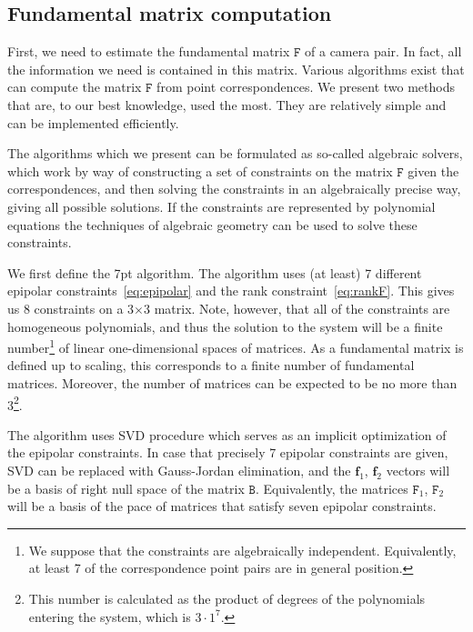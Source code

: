 \subsection{Fundamental matrix computation}

First, we need to estimate the fundamental matrix $\mathtt{F}$ of a camera pair. In fact, all the information we need is contained in this matrix. 
Various algorithms exist that can compute the matrix $\mathtt{F}$ from point correspondences. We present two methods that are, to our best knowledge, used the most. They are relatively simple and can be implemented efficiently. 

The algorithms which we present can be formulated as so-called algebraic solvers, which work by way of constructing a set of constraints on the matrix $\mathtt{F}$ given the correspondences, and then solving the constraints in an algebraically precise way, giving all possible solutions. If the constraints are represented by polynomial equations the techniques of algebraic geometry can be used to solve these constraints.

We first define the 7pt algorithm. The algorithm uses (at least) 7 different epipolar constraints~\ref{eq:epipolar} and the rank constraint~\ref{eq:rankF}. This gives us 8 constraints on a 3$\times$3 matrix. Note, however, that all of the constraints are homogeneous polynomials, and thus the solution to the system will be a finite number\footnote{We suppose that the constraints are algebraically independent. Equivalently, at least 7 of the correspondence point pairs are in general position.} of linear one-dimensional spaces of matrices. As a fundamental matrix is defined up to scaling, this corresponds to a finite number of fundamental matrices. Moreover, the number of matrices can be expected to be no more than 3\footnote{This number is calculated as the product of degrees of the polynomials entering the system, which is  $3 \cdot 1^7$.}.

The algorithm uses SVD procedure which serves as an implicit optimization of the epipolar constraints. In case that precisely 7 epipolar constraints are given, SVD can be replaced with Gauss-Jordan elimination, and the $\mathbf{f}_1$, $\mathbf{f}_2$ vectors will be a basis of  right null space of the matrix $\mathtt{B}$. Equivalently, the matrices $\mathtt{F}_1$, $\mathtt{F}_2$ will be a basis of the pace of matrices that satisfy seven epipolar constraints.

